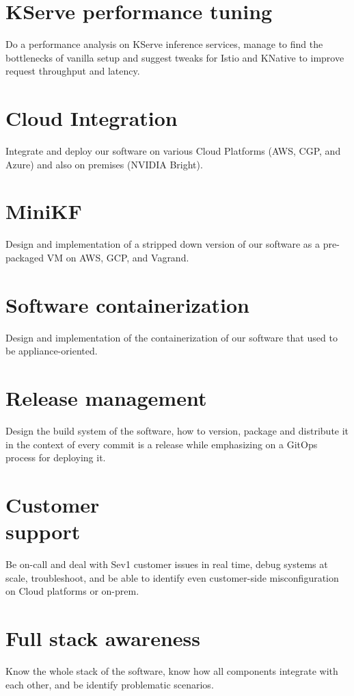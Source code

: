 \documentclass[margin,centered]{res}
\begin{document}
\begin{resume}
\section{\sc KServe performance tuning}
Do a performance analysis on KServe inference services, manage to find the
bottlenecks of vanilla setup and suggest tweaks for Istio and KNative to
improve request throughput and latency.

\section{\sc Cloud Integration}
Integrate and deploy our software on various Cloud Platforms (AWS, CGP, and
Azure) and also on premises (NVIDIA Bright).

\section{\sc MiniKF}
Design and implementation of a stripped down version of our software as a
pre-packaged VM on AWS, GCP, and Vagrand.

\section{\sc Software containerization}
Design and implementation of the containerization of our software that used
to be appliance-oriented.

\section{\sc Release management}
Design the build system of the software, how to version, package and distribute
it in the context of every commit is a release while emphasizing on a GitOps
process for deploying it.

\section{\sc Customer\\support}
Be on-call and deal with Sev1 customer issues in real time, debug systems at
scale, troubleshoot, and be able to identify even customer-side
misconfiguration on Cloud platforms or on-prem.

\section{\sc Full stack awareness}
Know the whole stack of the software, know how all components integrate with
each other, and be identify problematic scenarios.


\end{resume}
\end{document}
